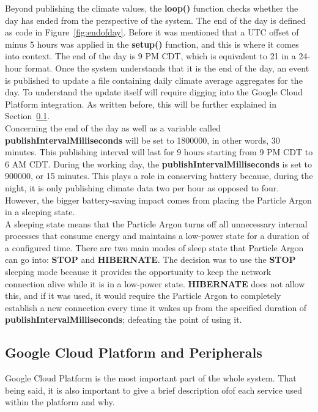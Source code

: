 \documentclass{article}
\begin{document}
Beyond publishing the climate values, the \textbf{loop()} function checks whether the day has ended from the perspective of the system. The end of the day is defined as code in Figure~\ref{fig:endofday}. Before it was mentioned that a UTC offset of minus 5 hours was applied in the \textbf{setup()} function, and this is where it comes into context. The end of the day is 9 PM CDT, which is equivalent to 21 in a 24-hour format. Once the system understands that it is the end of the day, an event is published to update a file containing daily climate average aggregates for the day. To understand the update itself will require digging into the Google Cloud Platform integration. As written before, this will be further explained in Section~\ref{section:gcp}.\\

Concerning the end of the day as well as a variable called \textbf{publishIntervalMilliseconds} will be set to 1800000, in other words, 30 minutes. This publishing interval will last for 9 hours starting from 9 PM CDT to 6 AM CDT. During the working day, the \textbf{publishIntervalMilliseconds} is set to 900000, or 15 minutes. This plays a role in conserving battery because, during the night, it is only publishing climate data two per hour as opposed to four. However, the bigger battery-saving impact comes from placing the Particle Argon in a sleeping state.\\

A sleeping state means that the Particle Argon turns off all unnecessary internal processes that consume energy and maintains a low-power state for a duration of a configured time. There are two main modes of sleep state that Particle Argon can go into: \textbf{STOP} and \textbf{HIBERNATE}. The decision was to use the \textbf{STOP} sleeping mode because it provides the opportunity to keep the network connection alive while it is in a low-power state. \textbf{HIBERNATE} does not allow this, and if it was used, it would require the Particle Argon to completely establish a new connection every time it wakes up from the specified duration of \textbf{publishIntervalMilliseconds}; defeating the point of using it.

\subsection{Google Cloud Platform and Peripherals}
\label{section:gcp}
Google Cloud Platform is the most important part of the whole system. That being said, it is also important to give a brief description ofof each service used within the platform and why.\\
\end{document}
